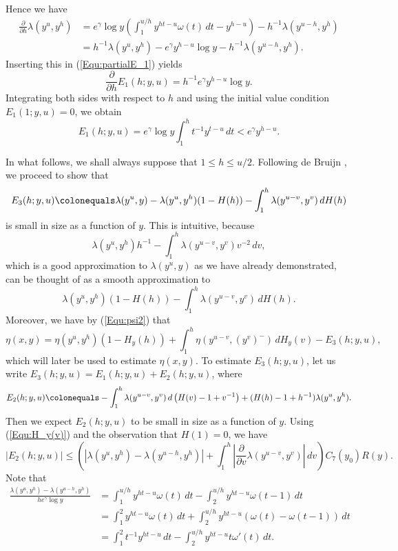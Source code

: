 \documentclass[12pt,reqno]{amsart}
\begin{document}
Hence we have
\begin{align*}
\frac{\partial}{\partial h}\lambda(y^u,y^h)&=e^{\gamma}\log y\left(\int_{1}^{u/h}y^{ht-u}\omega(t)\,dt-y^{h-u}\right)-h^{-1}\lambda(y^{u-h},y^h)\\
&=h^{-1}\lambda(y^u,y^h)-e^{\gamma}y^{h-u}\log y-h^{-1}\lambda(y^{u-h},y^h).
\end{align*}
Inserting this in (\ref{Equ:partialE_1}) yields
\[\frac{\partial}{\partial h}E_1(h;y,u)=h^{-1}e^{\gamma}y^{h-u}\log y.\]
Integrating both sides with respect to $h$ and using the initial value condition $E_1(1;y,u)=0$, we obtain 
\begin{equation}\label{Equ:E_1}
E_1(h;y,u)=e^{\gamma}\log y\int_{1}^{h}t^{-1}y^{t-u}\,dt<e^{\gamma}y^{h-u}.
\end{equation}
\par In what follows, we shall always suppose that $1\le h\le u/2$. Following de Bruijn \cite{Br}, we proceed to show that
\[E_3(h;y,u)\colonequals \lambda(y^u,y)-\lambda(y^u,y^h)(1-H(h))-\int_{1}^{h}\lambda(y^{u-v},y^v)\,dH(h)\]
is small in size as a function of $y$. This is intuitive, because
\[\lambda(y^u,y^h)h^{-1}-\int_{1}^{h}\lambda(y^{u-v},y^v)v^{-2}\,dv,\]
which is a good approximation to $\lambda(y^u,y)$ as we have already demonstrated, can be thought of as a smooth approximation to
\[\lambda(y^u,y^h)(1-H(h))-\int_{1}^{h}\lambda(y^{u-v},y^v)\,dH(h).\]
Moreover, we have by (\ref{Equ:psi2}) that
\begin{equation}\label{Equ:eta(x,y)1}
\eta(x,y)=\eta(y^u,y^h)(1-H_y(h))+\int_{1}^{h}\eta(y^{u-v},(y^v)^-)\,dH_y(v)-E_3(h;y,u),
\end{equation}
which will later be used to estimate $\eta(x,y)$. To estimate $E_3(h;y,u)$, let us write $E_3(h;y,u)=E_1(h;y,u)+E_2(h;y,u)$, where 
\[E_2(h;y,u)\colonequals-\int_{1}^{h}\lambda(y^{u-v},y^v)\,d\left(H(v)-1+v^{-1}\right)+(H(h)-1+h^{-1})\lambda(y^u,y^h).\]Then we expect $E_2(h;y,u)$ to be small in size as a function of $y$. Using (\ref{Equ:H_y(v)}) and the observation that $H(1)=0$, we have
\begin{equation}\label{Equ:E_2}
|E_2(h;y,u)|\le \left(\left|\lambda(y^u,y^h)-\lambda(y^{u-h},y^h)\right|+\int_{1}^{h}\left|\frac{\partial}{\partial v}\lambda(y^{u-v},y^v)\right|\,dv\right)C_7(y_0)R(y).
\end{equation}
Note that
\begin{align*}
\frac{\lambda(y^u,y^h)-\lambda(y^{u-h},y^h)}{he^{\gamma}\log y}&=\int_{1}^{u/h}y^{ht-u}\omega(t)\,dt-\int_{2}^{u/h}y^{ht-u}\omega(t-1)\,dt\\
&=\int_{1}^{2}y^{ht-u}\omega(t)\,dt+\int_{2}^{u/h}y^{ht-u}(\omega(t)-\omega(t-1))\,dt\\
&=\int_{1}^{2}t^{-1}y^{ht-u}\,dt-\int_{2}^{u/h}y^{ht-u}t\omega'(t)\,dt.
\end{align*}
\end{document}
